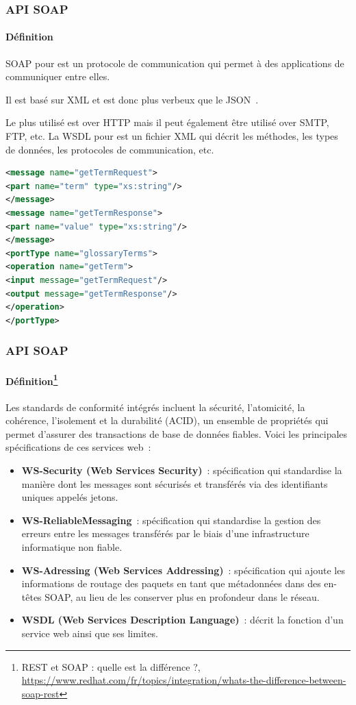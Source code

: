 \documentclass{beamer}
\begin{document}
    \begin{frame}[fragile]
        \transdissolve
        \frametitle{API SOAP}
        \framesubtitle{Définition}
        SOAP pour  est un protocole de communication qui permet à des applications de communiquer entre elles.

        Il est basé sur XML et est donc plus verbeux que le JSON~.

        Le plus utilisé est over HTTP mais il peut également être utilisé over SMTP, FTP, etc.
        \bigbreak
        La WSDL pour  est un fichier XML qui décrit les méthodes, les types de données, les protocoles de communication, etc.
        \begin{lstlisting}[language=xml,basicstyle=\ttfamily\tiny]
<message name="getTermRequest">
<part name="term" type="xs:string"/>
</message>
<message name="getTermResponse">
<part name="value" type="xs:string"/>
</message>
<portType name="glossaryTerms">
<operation name="getTerm">
<input message="getTermRequest"/>
<output message="getTermResponse"/>
</operation>
</portType>
        \end{lstlisting}
    \end{frame}
    \begin{frame}[fragile]
        \transdissolve
        \frametitle{API SOAP}
        \framesubtitle{Définition\footnote{REST et SOAP : quelle est la différence ?, \url{https://www.redhat.com/fr/topics/integration/whats-the-difference-between-soap-rest}}}
        \begin{footnotesize}
            Les standards de conformité intégrés incluent la sécurité, l'atomicité, la cohérence, l'isolement et la durabilité (ACID), un ensemble de propriétés qui permet d'assurer des transactions de base de données fiables.
            Voici les principales spécifications de ces services web~:
            \begin{itemize}
                \item \textbf{WS-Security (Web Services Security)}~: spécification qui standardise la manière dont les messages sont sécurisés et transférés via des identifiants uniques appelés jetons.
                \item \textbf{WS-ReliableMessaging}~: spécification qui standardise la gestion des erreurs entre les messages transférés par le biais d'une infrastructure informatique non fiable.
                \item \textbf{WS-Adressing (Web Services Addressing)}~: spécification qui ajoute les informations de routage des paquets en tant que métadonnées dans des en-têtes SOAP, au lieu de les conserver plus en profondeur dans le réseau.
                \item \textbf{WSDL (Web Services Description Language)}~: décrit la fonction d'un service web ainsi que ses limites.
            \end{itemize}
        \end{footnotesize}
    \end{frame}
\end{document}
